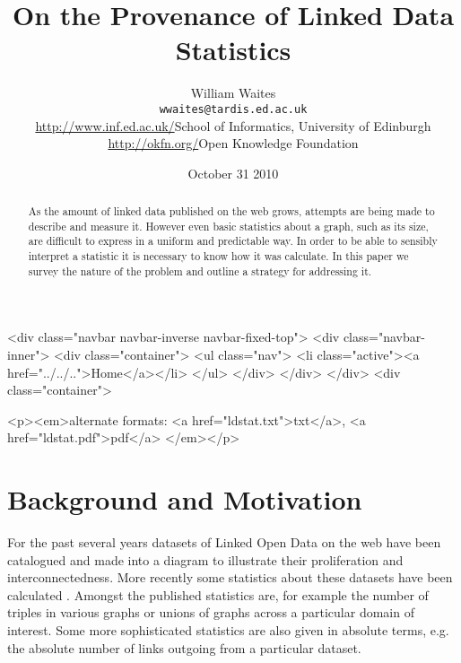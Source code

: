 \documentclass{article}
\begin{document}
\begin{htmlonly}
  \begin{rawhtml}
    <div class="navbar navbar-inverse navbar-fixed-top">
      <div class="navbar-inner">
	<div class="container">
          <ul class="nav">
            <li class="active"><a href="../../..">Home</a></li>
          </ul>
	</div>
      </div>
    </div>
    <div class="container">
  \end{rawhtml}
\end{htmlonly}
\title{On the Provenance of Linked Data Statistics}
\date{October 31 2010}
\author{William Waites\\
  \texttt{wwaites@tardis.ed.ac.uk}\\
  \url{http://www.inf.ed.ac.uk/}{School of Informatics, University of Edinburgh}\\
  \url{http://okfn.org/}{Open Knowledge Foundation}
}
\maketitle 
\begin{htmlonly}
  \begin{center}
  \begin{rawhtml}
    <p><em>alternate formats: 
        <a href="ldstat.txt">txt</a>,
        <a href="ldstat.pdf">pdf</a>
    </em></p>
  \end{rawhtml}
  \end{center}
\end{htmlonly}
\begin{abstract}
  As the amount of linked data published on the web grows,
  attempts are being made to describe and measure it. However
  even basic statistics about a graph, such as its size, 
  are difficult to express in a uniform and predictable
  way. In order to be able to sensibly interpret a statistic
  it is necessary to know how it was calculate. In this paper
  we survey the nature of the problem and outline a strategy
  for addressing it.
\end{abstract}

\section{Background and Motivation}

For the past several years datasets of Linked Open Data on
the web have been catalogued and made into a diagram 
\cite{LODC10} to illustrate their proliferation and 
interconnectedness. More recently some statistics about
these datasets have been calculated \cite{LODS10}. 
Amongst the published statistics are, for example the number
of triples in various graphs or unions of graphs across
a particular domain of interest. Some more sophisticated
statistics are also given in absolute terms, e.g. the
absolute number of links outgoing from a particular
dataset.
\end{document}
